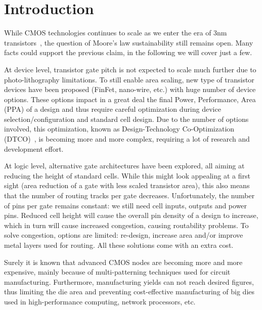 \documentclass[conference]{IEEEtran}
\begin{document}

\section{Introduction}
While CMOS technologies continues to scale as we enter the era of 3nm transistors~\cite{imec3nm}, the question of Moore's law sustainability still remains open. Many facts could support the previous claim, in the following we will cover just a few.

At device level, transistor gate pitch is not expected to scale much further due to photo-lithography limitations. To still enable area scaling, new type of transistor devices have been proposed (FinFet, nano-wire, etc.) with huge number of device options. These options impact in a great deal the final Power, Performance, Area (PPA) of a design and thus require careful optimization during device selection/configuration and standard cell design. Due to the number of options involved, this optimization, known as Design-Technology Co-Optimization (DTCO)~\cite{Mattii2017}, is becoming more and more complex, requiring a lot of research and development effort.

At logic level, alternative gate architectures have been explored, all aiming at reducing the height of standard cells. While this might look appealing at a first sight (area reduction of a gate with less scaled transistor area), this also means that the number of routing tracks per gate decreases. Unfortunately, the number of pins per gate remains constant: we still need cell inputs, outputs and power pins. Reduced cell height will cause the overall pin density of a design to increase, which in turn will cause increased congestion, causing routability problems. To solve congestion, options are limited: re-design, increase area and/or improve metal layers used for routing. All these solutions come with an extra cost.

Surely it is known that advanced CMOS nodes are becoming more and more expensive, mainly because of multi-patterning techniques used for circuit manufacturing. Furthermore, manufacturing yields can not reach desired figures, thus limiting the die area and preventing cost-effective manufacturing of big dies used in high-performance computing, network processors, etc. 
\end{document}
